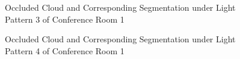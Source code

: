 \documentclass[11pt, a4paper,oneside,chapterprefix=false]{scrbook}
\begin{document}
\begin{figure}[H]
    \centering
      \label{fig:conf1 5 occluded} \hfill
     \label{fig:conf1 5 seg}
    \caption{Occluded Cloud and Corresponding Segmentation under Light Pattern 3 of Conference Room 1}
    \label{fig:conf1 5 occ and seg}
\end{figure}

\begin{figure}[H]
    \centering
      \label{fig:conf1 6 occluded} \hfill
     \label{fig:conf1 6 seg}
    \caption{Occluded Cloud and Corresponding Segmentation under Light Pattern 4 of Conference Room 1}
    \label{fig:conf1 6 occ and seg}
\end{figure}
\end{document}
